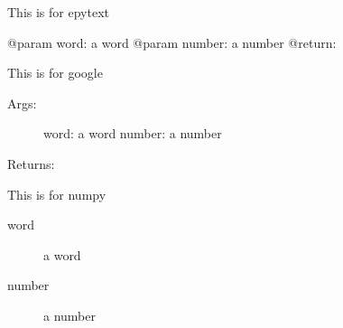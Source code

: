 \documentclass[letterpaper,10pt,english]{sphinxmanual}
\begin{document}
\begin{fulllineitems}
\label{\detokenize{documentation:documentation.docstring_formats.epytext}}
This is for epytext

@param word: a word
@param number: a number
@return:

\end{fulllineitems}


\begin{fulllineitems}
\label{\detokenize{documentation:documentation.docstring_formats.google}}
This is for google
\begin{description}
\item[{Args:}] \leavevmode
word: a word
number: a number

\end{description}

Returns:

\end{fulllineitems}


\begin{fulllineitems}
\label{\detokenize{documentation:documentation.docstring_formats.numpy}}
This is for numpy
\begin{description}
\item[{word}] \leavevmode
a word

\item[{number}] \leavevmode
a number

\end{description}

\end{fulllineitems}
\end{document}
